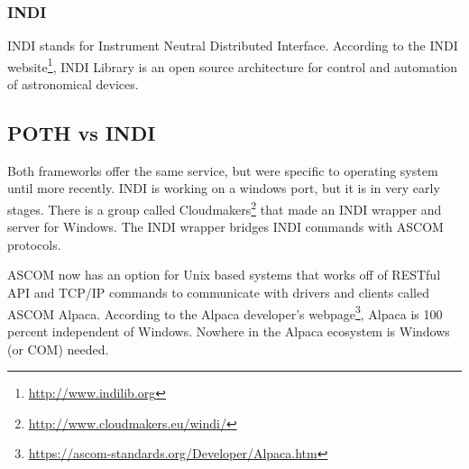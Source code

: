 \subsubsection{INDI}
INDI stands for Instrument Neutral Distributed Interface.
According to the INDI website\footnote{\url{http://www.indilib.org}}, INDI Library is an open source architecture for control and automation of astronomical devices.

\subsection{POTH vs INDI}
Both frameworks offer the same service, but were specific to operating system until more recently.
INDI is working on a windows port, but it is in very early stages. 
There is a group called Cloudmakers\footnote{\url{http://www.cloudmakers.eu/windi/}} that made an INDI wrapper and server for Windows.
The INDI wrapper bridges INDI commands with ASCOM protocols.

ASCOM now has an option for Unix based systems that works off of RESTful API and TCP/IP
commands to communicate with drivers and clients called ASCOM Alpaca.
According to the Alpaca developer's webpage\footnote{\url{https://ascom-standards.org/Developer/Alpaca.htm}},
Alpaca is 100 percent independent of Windows. Nowhere in the Alpaca ecosystem is Windows (or COM) needed.
